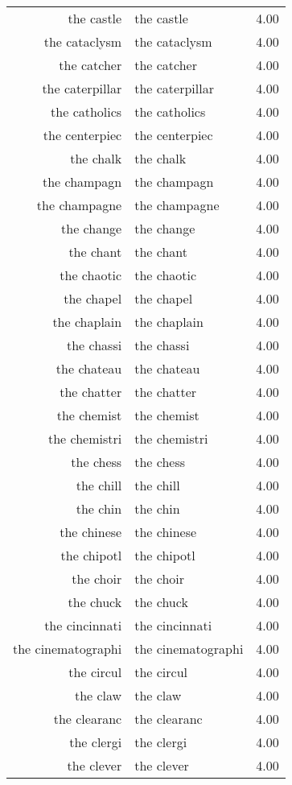 \begin{table}[ht]
\begin{tabular}{rlr}
  the castle & the castle & 4.00 \\ 
  the cataclysm & the cataclysm & 4.00 \\ 
  the catcher & the catcher & 4.00 \\ 
  the caterpillar & the caterpillar & 4.00 \\ 
  the catholics & the catholics & 4.00 \\ 
  the centerpiec & the centerpiec & 4.00 \\ 
  the chalk & the chalk & 4.00 \\ 
  the champagn & the champagn & 4.00 \\ 
  the champagne & the champagne & 4.00 \\ 
  the change & the change & 4.00 \\ 
  the chant & the chant & 4.00 \\ 
  the chaotic & the chaotic & 4.00 \\ 
  the chapel & the chapel & 4.00 \\ 
  the chaplain & the chaplain & 4.00 \\ 
  the chassi & the chassi & 4.00 \\ 
  the chateau & the chateau & 4.00 \\ 
  the chatter & the chatter & 4.00 \\ 
  the chemist & the chemist & 4.00 \\ 
  the chemistri & the chemistri & 4.00 \\ 
  the chess & the chess & 4.00 \\ 
  the chill & the chill & 4.00 \\ 
  the chin & the chin & 4.00 \\ 
  the chinese & the chinese & 4.00 \\ 
  the chipotl & the chipotl & 4.00 \\ 
  the choir & the choir & 4.00 \\ 
  the chuck & the chuck & 4.00 \\ 
  the cincinnati & the cincinnati & 4.00 \\ 
  the cinematographi & the cinematographi & 4.00 \\ 
  the circul & the circul & 4.00 \\ 
  the claw & the claw & 4.00 \\ 
  the clearanc & the clearanc & 4.00 \\ 
  the clergi & the clergi & 4.00 \\ 
  the clever & the clever & 4.00 \\ 

\end{tabular}
\end{table}
